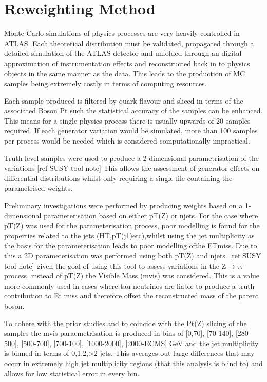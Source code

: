 \section{Reweighting Method}
\label{sec:reweighting}

Monte Carlo simulations of physics processes are very heavily controlled in ATLAS. Each theoretical distribution must be validated, propagated through a detailed simulation of the ATLAS detector and unfolded through an digital approximation of instrumentation effects and reconstructed back in to physics objects in the same manner as the data. This leads to the production of MC samples being extremely costly in terms of computing resources.

Each sample produced is filtered by quark flavour and sliced in terms of the associated Boson Pt such the statistical accuracy of the samples can be enhanced. This means for a single physics process there is usually upwards of 20 samples required. If each generator variation would be simulated, more than 100 samples per process would be needed which is considered computationally impractical. 

Truth level samples were used to produce a 2 dimensional parametrisation of the variations [ref SUSY tool note] This allows the assessment of generator effects on differential distributions whilst only requiring a single file containing the parametrised weights. 

Preliminary investigations were performed by producing weights based on a 1-dimensional parameterisation  based  on  either pT(Z) or njets. For  the  case  where pT(Z)  was used  for  the  parameterisation process, poor modelling is found for the properties related to the jets (HT,pT(j1)etc),whilst using the jet multiplicity as the basis for the parameterisation leads to poor modelling ofthe ETmiss.  Due to this a 2D parameterisation was performed using both pT(Z) and njets. [ref SUSY tool note] given the goal of using this tool to assess variations in the Z$\rightarrow\tau\tau$ process, instead of pT(Z) the Visible Mass (mvis) was considered. This is a value more commonly used in cases where tau neutrinos are liable to produce a truth contribution to Et miss and therefore offset the reconstructed mass of the parent boson.

To cohere with the prior studies and to coincide with the Pt(Z) slicing of the samples the mvis paraemetrisation is produced in bins of [0,70], [70-140], [280-500], [500-700], [700-100], [1000-2000], [2000-ECMS] GeV and the jet multiplicity is binned in terms of 0,1,2,>2 jets. This averages out large differences that may occur in extremely high jet multiplicity regions (that this analysis is blind to) and allows for low statistical error in every bin.

